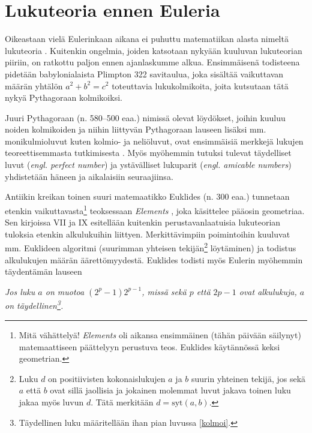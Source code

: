 \documentclass[a4paper,11pt]{article}
\begin{document}
\section{Lukuteoria ennen Euleria}
\label{kakkoi}

Oikeastaan vielä Eulerinkaan aikana ei puhuttu matematiikan alasta nimeltä lukuteoria \cite{Karatsuba}. Kuitenkin ongelmia, joiden katsotaan nykyään kuuluvan lukuteorian piiriin, on ratkottu paljon ennen ajanlaskumme alkua. Ensimmäisenä todisteena pidetään babylonialaista Plimpton 322 savitaulua, joka sisältää vaikuttavan määrän yhtälön $a^2+b^2=c^2$ toteuttavia lukukolmikoita, joita kutsutaan tätä nykyä Pythagoraan kolmikoiksi.

Juuri Pythagoraan (n. 580–500 eaa.) nimissä olevat löydökset, joihin kuuluu noiden kolmikoiden ja niihin liittyvän Pythagoraan lauseen lisäksi mm. monikulmioluvut kuten kolmio- ja neliöluvut, ovat ensimmäisiä merkkejä lukujen teoreettisemmasta tutkimisesta \cite{Burton}. Myös myöhemmin tutuksi tulevat täydelliset luvut (\textit{engl. perfect number}) ja ystävälliset lukuparit (\textit{engl. amicable numbers}) yhdistetään häneen ja aikalaisiin seuraajiinsa.

Antiikin kreikan toinen suuri matemaatikko Euklides (n. 300 eaa.) tunnetaan etenkin vaikuttavasta\footnote{Mitä vähättelyä! \textit{Elements} oli aikansa ensimmäinen (tähän päivään säilynyt) matemaattiseen päättelyyn perustuva teos. Euklides käytännössä keksi geometrian.} teoksessaan \textit{Elements} \cite{Elements}, joka käsittelee pääosin geometriaa. Sen kirjoissa VII ja IX esitellään kuitenkin perustavanlaatuisia lukuteorian tuloksia etenkin alkulukuihin liittyen. Merkittävimpiin poimintoihin kuuluvat mm. Euklideen algoritmi (suurimman yhteisen tekijän\footnote{Luku $d$ on positiivisten kokonaislukujen $a$ ja $b$ suurin yhteinen tekijä, jos sekä $a$ että $b$ ovat sillä jaollisia ja jokainen molemmat luvut jakava toinen luku jakaa myös luvun $d$. Tätä merkitään $d=\text{syt}(a,b)$.} löytäminen) ja todistus alkulukujen määrän äärettömyydestä. Euklides todisti myös Eulerin myöhemmin täydentämän lauseen

\begin{center}
    \textit{Jos luku $a$ on muotoa $(2^p-1)2^{p-1}$, missä sekä $p$ että $2p-1$ ovat alkulukuja, $a$ on täydellinen\footnote{Täydellinen luku määritellään ihan pian luvussa \ref{kolmoi}.}.}
\end{center}
\end{document}

